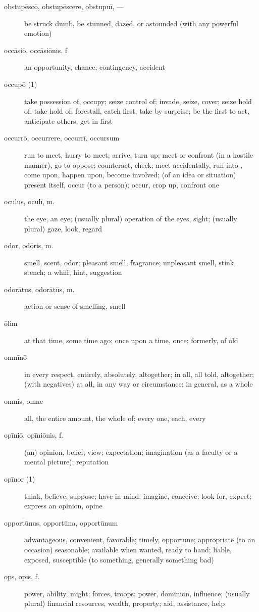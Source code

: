 \begin{description}
    \item[obstupēscō, obstupēscere, obstupuī, ---] be struck dumb, be stunned, dazed, or astounded (with any powerful emotion)
    \item[occāsiō, occāsiōnis. f] an opportunity, chance; contingency, accident
    \item[occupō (1)] take possession of, occupy; seize control of; invade, seize, cover; seize hold of, take hold of; forestall, catch first, take by surprise; be the first to act, anticipate others, get in first
    \item[occurrō, occurrere, occurrī, occursum] run to meet, hurry to meet; arrive, turn up; meet or confront (in a hostile manner), go to oppose; counteract, check; meet accidentally, run into , come upon, happen upon, become involved; (of an idea or situation) present itself, occur (to a person); occur, crop up, confront one
    \item[oculus, oculī, m.] the eye, an eye; (usually plural) operation of the eyes, sight; (usually plural) gaze, look, regard
    \item[odor, odōris, m.] smell, scent, odor; pleasant smell, fragrance; unpleasant smell, stink, stench; a whiff, hint, suggestion
    \item[odorātus, odorātūs, m.] action or sense of smelling, smell
    \item[ōlim] at that time, some time ago; once upon a time, once; formerly, of old
    \item[omnīnō] in every respect, entirely, absolutely, altogether; in all, all told, altogether; (with negatives) at all, in any way or circumstance; in general, as a whole
    \item[omnis, omne] all, the entire amount, the whole of; every one, each, every
    \item[opīniō, opīniōnis, f.] (an) opinion, belief, view; expectation; imagination (as a faculty or a mental picture); reputation
    \item[opīnor (1)] think, believe, suppose; have in mind, imagine, conceive; look for, expect; express an opinion, opine
    \item[opportūnus, opportūna, opportūnum] advantageous, convenient, favorable; timely, opportune; appropriate (to an occasion) seasonable; available when wanted, ready to hand; liable, exposed, susceptible (to something, generally something bad)
    \item[ops, opis, f.] power, ability, might; forces, troops; power, dominion, influence; (usually plural) financial resources, wealth, property; aid, assistance, help

\end{description}
